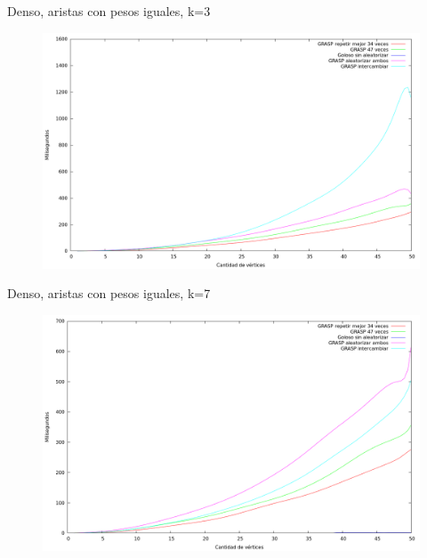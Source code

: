 \vspace*{0.5cm}

Denso, aristas con pesos iguales, k=3
\vspace*{0.5cm}

\begin{figure}[h]
  \begin{center}
    \includegraphics[scale=0.35]{imagenes/ej6-denso-pesos-iguales-k3-tiempo.png}
  \end{center}
\end{figure}

\vspace*{0.5cm}

Denso, aristas con pesos iguales, k=7
\vspace*{0.5cm}

\begin{figure}[h]
  \begin{center}
    \includegraphics[scale=0.35]{imagenes/ej6-denso-pesos-iguales-k7-tiempo.png}
  \end{center}
\end{figure}

